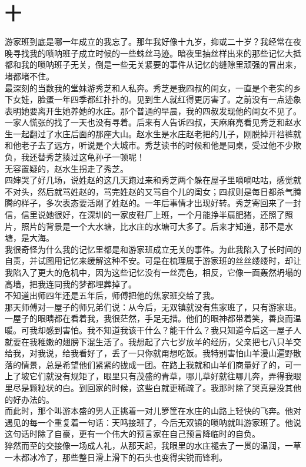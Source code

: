 \fancyhead[RO]{\thepage} %
\fancyhead[LE]{\thepage} %
\fancyfoot[LE,RO]{}
\fancyfoot[LO,CE]{}
\fancyfoot[CO,RE]{}
\chapter*{十}
游家班到底是哪一年成立的我忘了。那年我好像十九岁，抑或二十岁？我经常在夜晚寻找我的唢呐班子成立时候的一些蛛丝马迹。暗夜里抽丝样出来的那些记忆大抵都和我的唢呐班子无关，倒是一些无关紧要的事件从记忆的缝隙里顽强的冒出来，堵都堵不住。\\

最深刻的当数我的堂妹游秀芝和人私奔。秀芝是我四叔的闺女，一直是个老实的乡下女娃，脸蛋一年四季都红扑扑的。见到生人就红得更厉害了。之前没有一点迹象表明她要离开生她养她的水庄。那个普通的早晨，我的四叔发现他的闺女不见了。一家人慌张的找了一天也没有寻着。后来有人告诉四叔，天麻麻亮看见秀芝和赵水生一起翻过了水庄后面的那座大山。赵水生是水庄赵老把的儿子，刚脱掉开裆裤就和他老子去了远方，听说是个大城市。秀芝读书的时候和他是同桌，受过他不少欺负，我还替秀芝揍过这龟孙子一顿呢！\\

无容置疑的，赵水生拐走了秀芝。\\

四婶哭了好几场，说姓赵的这几天跑过来和秀芝两个躲在屋子里嘀嘀咕咕，感觉就不对头，然后就骂姓赵的，骂完姓赵的又骂自个儿的闺女；四叔则是每日都杀气腾腾的样子，多次表态要活剐了姓赵的。一年后事情才出现好转。秀芝寄回来了一封信，信里说她很好，在深圳的一家皮鞋厂上班，一个月能挣半扇肥猪，还照了照片，照片的背景是一个大水塘，比水庄的水塘可大多了。后来才知道，那不是水塘，是大海。\\

我很奇怪为什么我的记忆里都是和游家班成立无关的事件。为此我陷入了长时间的自责，并试图用记忆来缓解这种不安。可是在梳理属于游家班的丝丝缕缕时，却让我陷入了更大的危机中，因为这些记忆没有一丝亮色，相反，它像一面轰然坍塌的高墙，把我连同我的梦都埋葬掉了。\\

不知道出师四年还是五年后，师傅把他的焦家班交给了我。\\

那天师傅对一屋子的师兄弟们说：从今后，无双镇就没有焦家班了，只有游家班。一屋子的眼睛都在看着我，我很茫然，手足无措。他们的眼神都带着笑，善良而温暖。可我却感到害怕。我不知道我该干什么？能干什么？我只知道今后这一屋子人就要在我稚嫩的翅膀下混生活了。我想起了六七岁放羊的经历，父亲把七八只羊交给我，对我说，给我看好了，丢了一只你就甭想吃饭。我特别害怕山羊漫山遍野散落的情景，总是希望他们紧紧的拢成一团。在路上我就和山羊们商量好了的，可一上了坡它们就没有规矩了，眼里只有茂盛的青草，哪儿草好就往哪儿奔，弄得我眼里尽是颗粒状的白。到回家的时候，这些白就更稀疏了。我那时除了哭真是没其他的好办法的。\\

而此时，那个叫游本盛的男人正挑着一对儿箩筐在水庄的山路上轻快的飞奔。他对遇见的每一个重复着一句话：天鸣接班了，今后无双镇的唢呐就叫游家班了。他说这句话时除了自豪，更有一个伟大的预言家在自己预言降临时的自负。\\

猝然而至的交接像一场成人礼，从那天起，我眼里的水庄褪去了一贯的温润，一草一木都冰冷了，那些整日滑上滑下的石头也变得尖锐而锋利。\\